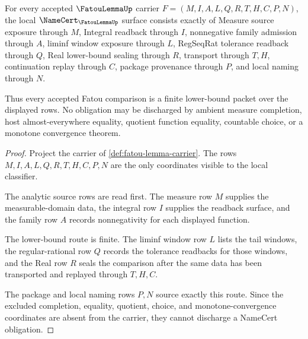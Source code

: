 \begin{theorem}
\label{thm:fatou-lemma-namecert-obligations}
For every accepted $\FatouLemmaUp$ carrier $F=(M,I,A,L,Q,R,T,H,C,P,N)$, the local $\NameCert_{\FatouLemmaUp}$ surface consists exactly of Measure source exposure through $M$, Integral readback through $I$, nonnegative family admission through $A$, liminf window exposure through $L$, RegSeqRat tolerance readback through $Q$, Real lower-bound sealing through $R$, transport through $T,H$, continuation replay through $C$, package provenance through $P$, and local naming through $N$.

Thus every accepted Fatou comparison is a finite lower-bound packet over the displayed rows. No obligation may be discharged by ambient measure completion, host almost-everywhere equality, quotient function equality, countable choice, or a monotone convergence theorem.
\end{theorem}
\begin{proof}
Project the carrier of \autoref{def:fatou-lemma-carrier}. The rows $M,I,A,L,Q,R,T,H,C,P,N$ are the only coordinates visible to the local classifier.

The analytic source rows are read first. The measure row $M$ supplies the measurable-domain data, the integral row $I$ supplies the readback surface, and the family row $A$ records nonnegativity for each displayed function.

The lower-bound route is finite. The liminf window row $L$ lists the tail windows, the regular-rational row $Q$ records the tolerance readbacks for those windows, and the Real row $R$ seals the comparison after the same data has been transported and replayed through $T,H,C$.

The package and local naming rows $P,N$ source exactly this route. Since the excluded completion, equality, quotient, choice, and monotone-convergence coordinates are absent from the carrier, they cannot discharge a NameCert obligation.
\end{proof}

